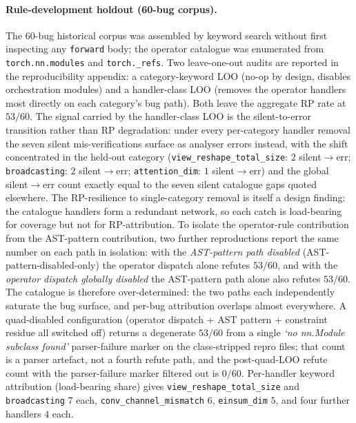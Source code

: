 \paragraph{Rule-development holdout (60-bug corpus).}
The $60$-bug historical corpus was assembled by keyword search
without first inspecting any \texttt{forward} body; the operator
catalogue was enumerated from \texttt{torch.nn.modules} and
\texttt{torch.\_refs}. Two leave-one-out audits are reported in
the reproducibility appendix: a category-keyword LOO (no-op by
design, disables orchestration modules) and a handler-class LOO
(removes the operator handlers most directly on each category's
bug path). Both leave the aggregate RP rate at $53/60$.
The signal carried by the handler-class LOO is the
silent-to-error transition rather than RP degradation:
under every per-category handler removal the seven silent
mis-verifications surface as analyser errors instead, with the
shift concentrated in the held-out category
(\texttt{view\_reshape\_total\_size}: $2$ silent$\to$err;
\texttt{broadcasting}: $2$ silent$\to$err;
\texttt{attention\_dim}: $1$ silent$\to$err) and the global
silent$\to$err count exactly equal to the seven silent
catalogue gaps quoted elsewhere. The RP-resilience to
single-category removal is itself a design finding: the
catalogue handlers form a redundant network, so each catch is
load-bearing for coverage but not for RP-attribution.
To isolate the operator-rule contribution from the AST-pattern
contribution, two further reproductions report the same number
on each path in isolation: with the \emph{AST-pattern path
disabled} (AST-pattern-disabled-only) the operator dispatch
alone refutes $53/60$, and with the \emph{operator dispatch
globally disabled} the AST-pattern path alone also refutes
$53/60$. The catalogue is therefore over-determined: the two
paths each independently saturate the bug surface, and per-bug
attribution overlaps almost everywhere. A quad-disabled
configuration (operator dispatch + AST pattern + constraint
residue all switched off) returns a degenerate $53/60$ from a
single \emph{`no nn.Module subclass found'} parser-failure
marker on the class-stripped repro files; that count is a
parser artefact, not a fourth refute path, and the
post-quad-LOO refute count with the parser-failure marker
filtered out is $0/60$. Per-handler keyword
attribution (load-bearing share) gives
\texttt{view\_reshape\_total\_size} and
\texttt{broadcasting} $7$ each, \texttt{conv\_channel\_mismatch}
$6$, \texttt{einsum\_dim} $5$, and four further handlers $4$
each.


